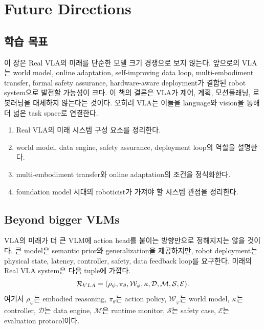 \chapter{Future Directions}

\section*{학습 목표}

이 장은 Real VLA의 미래를 단순한 모델 크기 경쟁으로 보지 않는다. 앞으로의 VLA는 world model, online adaptation, self-improving data loop, multi-embodiment transfer, formal safety assurance, hardware-aware deployment가 결합된 robot system으로 발전할 가능성이 크다. 이 책의 결론은 VLA가 제어, 계획, 모션플래닝, 로봇러닝을 대체하지 않는다는 것이다. 오히려 VLA는 이들을 language와 vision을 통해 더 넓은 task space로 연결한다.

\begin{enumerate}
  \item Real VLA의 미래 시스템 구성 요소를 정리한다.
  \item world model, data engine, safety assurance, deployment loop의 역할을 설명한다.
  \item multi-embodiment transfer와 online adaptation의 조건을 정식화한다.
  \item foundation model 시대의 roboticist가 가져야 할 시스템 관점을 정리한다.
\end{enumerate}

\section{Beyond bigger VLMs}

VLA의 미래가 더 큰 VLM에 action head를 붙이는 방향만으로 정해지지는 않을 것이다. 큰 model은 semantic prior와 generalization을 제공하지만, robot deployment는 physical state, latency, controller, safety, data feedback loop를 요구한다. 미래의 Real VLA system은 다음 tuple에 가깝다.
\begin{equation}
  \mathcal{R}_{VLA}
  =
  (
  \rho_{\psi},
  \pi_{\theta},
  \mathcal{W}_{\varphi},
  \kappa,
  \mathcal{D},
  \mathcal{M},
  \mathcal{S},
  \mathcal{E}
  ).
  \label{eq:ch22-real-vla-system}
\end{equation}
여기서 $\rho_{\psi}$는 embodied reasoning, $\pi_{\theta}$는 action policy, $\mathcal{W}_{\varphi}$는 world model, $\kappa$는 controller, $\mathcal{D}$는 data engine, $\mathcal{M}$은 runtime monitor, $\mathcal{S}$는 safety case, $\mathcal{E}$는 evaluation protocol이다.

